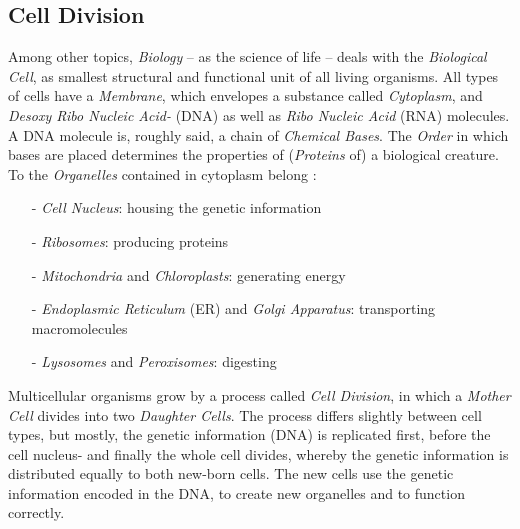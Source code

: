 %
%
%
%
%
%
%

\subsection{Cell Division}
\label{cell_division_heading}

Among other topics, \emph{Biology} -- as the science of life -- deals with the
\emph{Biological Cell}, as smallest structural and functional unit of all
living organisms. All types of cells have a \emph{Membrane}, which envelopes a
substance called \emph{Cytoplasm}, and \emph{Desoxy Ribo Nucleic Acid-} (DNA)
as well as \emph{Ribo Nucleic Acid} (RNA) molecules. A DNA molecule is, roughly
said, a chain of \emph{Chemical Bases}. The \emph{Order} in which bases are
placed determines the properties of (\emph{Proteins} of) a biological creature.
To the \emph{Organelles} contained in cytoplasm belong \cite{wikipedia}:

\begin{itemize}
    \item[-] \emph{Cell Nucleus}: housing the genetic information
    \item[-] \emph{Ribosomes}: producing proteins
    \item[-] \emph{Mitochondria} and \emph{Chloroplasts}: generating energy
    \item[-] \emph{Endoplasmic Reticulum} (ER) and \emph{Golgi Apparatus}:
        transporting macromolecules
    \item[-] \emph{Lysosomes} and \emph{Peroxisomes}: digesting
\end{itemize}

Multicellular organisms grow by a process called \emph{Cell Division}, in which
a \emph{Mother Cell} divides into two \emph{Daughter Cells}. The process differs
slightly between cell types, but mostly, the genetic information (DNA) is
replicated first, before the cell nucleus- and finally the whole cell divides,
whereby the genetic information is distributed equally to both new-born cells.
The new cells use the genetic information encoded in the DNA, to create new
organelles and to function correctly.

